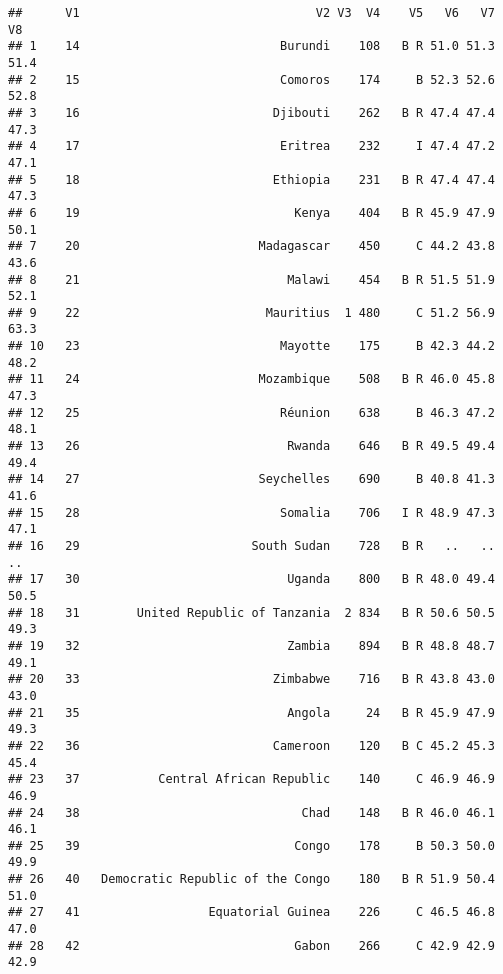 \documentclass[]{article}
\newenvironment{Shaded}{\begin{snugshade}}{\end{snugshade}}
\newcommand{\KeywordTok}[1]{\textcolor[rgb]{0.13,0.29,0.53}{\textbf{#1}}}
\newcommand{\NormalTok}[1]{#1}
\newcommand{\OperatorTok}[1]{\textcolor[rgb]{0.81,0.36,0.00}{\textbf{#1}}}
\newcommand{\StringTok}[1]{\textcolor[rgb]{0.31,0.60,0.02}{#1}}
\begin{document}
\begin{Shaded}
\end{Shaded}

\begin{verbatim}
##      V1                                 V2 V3  V4    V5   V6   V7   V8
## 1    14                            Burundi    108   B R 51.0 51.3 51.4
## 2    15                            Comoros    174     B 52.3 52.6 52.8
## 3    16                           Djibouti    262   B R 47.4 47.4 47.3
## 4    17                            Eritrea    232     I 47.4 47.2 47.1
## 5    18                           Ethiopia    231   B R 47.4 47.4 47.3
## 6    19                              Kenya    404   B R 45.9 47.9 50.1
## 7    20                         Madagascar    450     C 44.2 43.8 43.6
## 8    21                             Malawi    454   B R 51.5 51.9 52.1
## 9    22                          Mauritius  1 480     C 51.2 56.9 63.3
## 10   23                            Mayotte    175     B 42.3 44.2 48.2
## 11   24                         Mozambique    508   B R 46.0 45.8 47.3
## 12   25                            Réunion    638     B 46.3 47.2 48.1
## 13   26                             Rwanda    646   B R 49.5 49.4 49.4
## 14   27                         Seychelles    690     B 40.8 41.3 41.6
## 15   28                            Somalia    706   I R 48.9 47.3 47.1
## 16   29                        South Sudan    728   B R   ..   ..   ..
## 17   30                             Uganda    800   B R 48.0 49.4 50.5
## 18   31        United Republic of Tanzania  2 834   B R 50.6 50.5 49.3
## 19   32                             Zambia    894   B R 48.8 48.7 49.1
## 20   33                           Zimbabwe    716   B R 43.8 43.0 43.0
## 21   35                             Angola     24   B R 45.9 47.9 49.3
## 22   36                           Cameroon    120   B C 45.2 45.3 45.4
## 23   37           Central African Republic    140     C 46.9 46.9 46.9
## 24   38                               Chad    148   B R 46.0 46.1 46.1
## 25   39                              Congo    178     B 50.3 50.0 49.9
## 26   40   Democratic Republic of the Congo    180   B R 51.9 50.4 51.0
## 27   41                  Equatorial Guinea    226     C 46.5 46.8 47.0
## 28   42                              Gabon    266     C 42.9 42.9 42.9

\end{verbatim}
\end{document}
